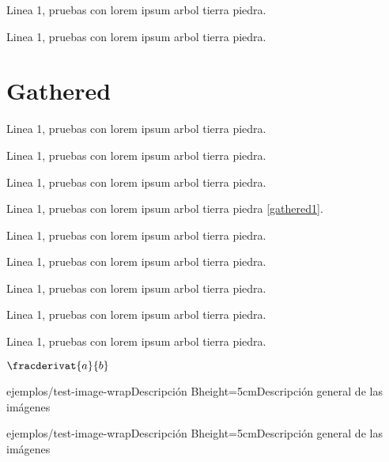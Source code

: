 Linea 1, pruebas con lorem ipsum arbol tierra piedra.


Linea 1, pruebas con lorem ipsum arbol tierra piedra.

\newpage
\section{Gathered}

Linea 1, pruebas con lorem ipsum arbol tierra piedra.


Linea 1, pruebas con lorem ipsum arbol tierra piedra.


Linea 1, pruebas con lorem ipsum arbol tierra piedra.

\insertgathered[\label{gathered1}]{arg2 \\ arg 4}

Linea 1, pruebas con lorem ipsum arbol tierra piedra \eqref{gathered1}.


Linea 1, pruebas con lorem ipsum arbol tierra piedra.


Linea 1, pruebas con lorem ipsum arbol tierra piedra.


Linea 1, pruebas con lorem ipsum arbol tierra piedra.

\insertgatheredcaptioned[\label{gathered3}]{arg2}{}

Linea 1, pruebas con lorem ipsum arbol tierra piedra.


Linea 1, pruebas con lorem ipsum arbol tierra piedra.

\newpage
{}
$\fracderivat{a}{b}$

\newpage

{ejemplos/test-image-wrap}{Descripción B}{height=5cm}{Descripción general de las imágenes}

{ejemplos/test-image-wrap}{Descripción B}{height=5cm}{Descripción general de las imágenes}


